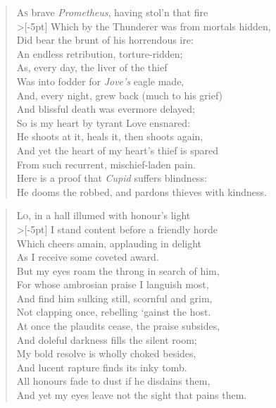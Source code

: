 \documentclass[a5paper, oneside]{memoir}
\begin{document}
\PoemTitle{}
\begin{verse}
    \lettrine{A}{s} brave \textit{Prometheus}, having stol'n that fire \\>[-5pt]
    Which by the Thunderer was from mortals hidden, \\
    Did bear the brunt of his horrendous ire: \\
    An endless retribution, torture-ridden; \\
    As, every day, the liver of the thief \\
    Was into fodder for \textit{Jove's} eagle made, \\
    And, every night, grew back (much to his grief) \\
    And blissful death was evermore delayed; \\
    So is my heart by tyrant Love ensnared: \\
    He shoots at it, heals it, then shoots again, \\
    And yet the heart of my heart's thief is spared \\
    From such recurrent, mischief-laden pain. \\
    \vin Here is a proof that \textit{Cupid} suffers blindness: \\
    \vin He dooms the robbed, and pardons thieves with kindness.
\end{verse}

\PoemTitle{}
\begin{verse}
    \lettrine{L}{o}, in a hall illumed with honour's light \\>[-5pt]
    I stand content before a friendly horde \\
    Which cheers amain, applauding in delight \\
    As I receive some coveted award. \\
    But my eyes roam the throng in search of him, \\
    For whose ambrosian praise I languish most, \\
    And find him sulking still, scornful and grim, \\
    Not clapping once, rebelling `gainst the host. \\
    At once the plaudits cease, the praise subsides, \\
    And doleful darkness fills the silent room; \\
    My bold resolve is wholly choked besides, \\
    And lucent rapture finds its inky tomb. \\
    \vin All honours fade to dust if he disdains them, \\
    \vin And yet my eyes leave not the sight that pains them.
\end{verse}
\end{document}
